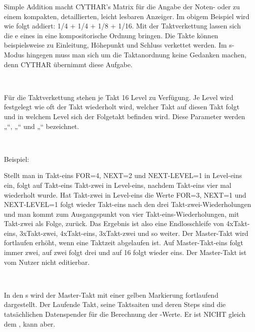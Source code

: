 \documentclass[10pt,final,a4paper]{report}
\begin{document}
Simple Addition macht CYTHAR's Matrix für die Angabe der Noten- oder  zu einem kompakten, detaillierten, leicht lesbaren Anzeiger. Im obigem Beispiel wird wie folgt addiert: 1/4 + 1/4 + 1/8 + 1/16.
%
%
%
%
%	
%
%
Mit der Taktverkettung lassen sich die e eines  in eine kompositorische Ordnung bringen. Die Takte können beispielsweise zu Einleitung, Höhepunkt und Schluss verkettet werden. 
Im s-Modus hingegen muss man sich um die Taktanordnung keine Gedanken machen, denn CYTHAR übernimmt diese Aufgabe.

~

Für die Taktverkettung stehen je Takt 16 Level zu Verfügung. Je Level wird festgelegt wie oft der Takt wiederholt wird, welcher Takt auf diesen Takt folgt und in welchem Level sich der Folgetakt befinden wird.
Diese Parameter werden „“, „“ und „“ bezeichnet.
 
~

Beispiel: 

Stellt man in Takt-eins FOR=4, NEXT=2 und NEXT-LEVEL=1 in Level-eins ein, folgt auf Takt-eins Takt-zwei in Level-eins, nachdem Takt-eins vier mal wiederholt wurde. Hat Takt-zwei in Level-eins die Werte FOR=3, NEXT=1 und NEXT-LEVEL=1 folgt wieder Takt-eins nach den drei Takt-zwei-Wiederholungen und man kommt zum Ausgangspunkt von vier Takt-eins-Wiederholungen, mit Takt-zwei als Folge, zurück. Das Ergebnis ist also eine Endlosschleife von 4xTakt-eins, 3xTakt-zwei, 4xTakt-eins, 3xTakt-zwei und so weiter.
%
%
%
Der Master-Takt wird fortlaufen erhöht, wenn eine Taktzeit abgelaufen ist. Auf Master-Takt-eins folgt immer zwei, auf zwei folgt drei und auf 16 folgt wieder eins. Der Master-Takt ist vom Nutzer nicht editierbar. 

~

In den s wird der Master-Takt mit einer gelben Markierung fortlaufend dargestellt.
%
%
%
Der Laufende Takt, seine Taktsaiten und deren Steps sind die tatsächlichen Datenspender für die Berechnung der -Werte. Er ist NICHT gleich dem , kann aber. 
\end{document}
